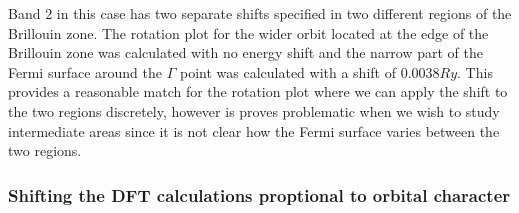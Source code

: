 Band $2$ in this case has two separate shifts specified in two different regions of the Brillouin zone. The rotation plot for the wider orbit located at the edge of the Brillouin zone was calculated with no energy shift and the narrow part of the Fermi surface around the $\Gamma$ point was calculated with a shift of $0.0038\unit{Ry}$. This provides a reasonable match for the rotation plot where we can apply the shift to the two regions discretely, however is proves problematic when we wish to study intermediate areas since it is not clear how the Fermi surface varies between the two regions.

\subsubsection{Shifting the DFT calculations proptional to orbital character}
\label{Sec:ShiftingDFTPropToOrbitalCharacter}

